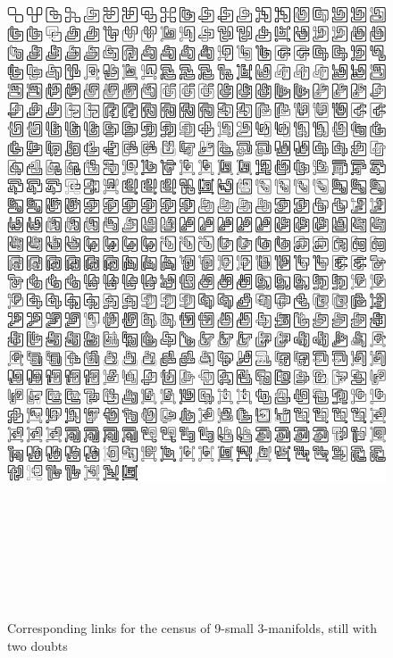 \newpage

\begin{figure}[h!tp]
   \begin{center}
      \leavevmode
      \includegraphics[height=22.0cm]{E.figsbw2/primespace487representantlinks_bw.pdf}
   \end{center}
   \vspace{-0.7cm}
   \caption{Corresponding links for the census of 9-small 3-manifolds, still with two doubts}
   \label{fig:primeSpace487RepresentativeLinks}
\end{figure}

\newpage

